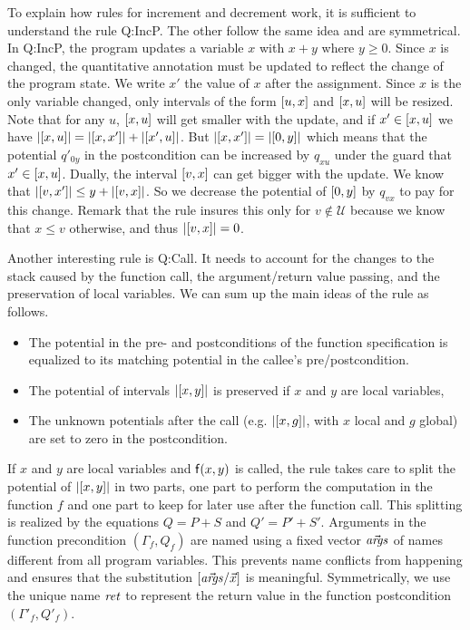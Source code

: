 \documentclass[nocopyrightspace,preprint]{sigplanconf}
\begin{document}
To explain how rules for increment and decrement work, it is
sufficient to understand the rule {\sc Q:IncP}.  The other follow the
same idea and are symmetrical.  In {\sc Q:IncP}, the program updates a
variable $x$ with $x+y$ where $y \ge 0$.  Since $x$ is changed, the
quantitative annotation must be updated to reflect the change of the
program state.  We write $x'$ the value of $x$ after the assignment.
Since $x$ is the only variable changed, only intervals of the form
$[u,x]$ and $[x,u]$ will be resized.  Note that for any $u$,
$[x,u]$ will get smaller with the update, and if $x' \in [x,u]$ we have $|[x,u]| = |[x,x']| + |[x',u]|$.  But
$|[x,x']| = |[0,y]|$ which means that the potential
$q'_{0y}$ in the postcondition can be increased by $q_{xu}$ under the
guard that $x' \in [x,u]$.  Dually, the interval $[v,x]$ can
get bigger with the update.  We know that $|[v,x']| \le y +
|[v,x]|$.  So we decrease the potential of $[0,y]$ by
$q_{vx}$ to pay for this change.  Remark that the rule insures this
only for $v \not\in \mathcal U$ because we know that $x \le v$
otherwise, and thus $|[v,x]| = 0$.

Another interesting rule is {\sc Q:Call}.  It needs to account for the
changes to the stack caused by the function call, the argument/return
value passing, and the preservation of local variables.  We can sum up
the main ideas of the rule as follows.
\begin{itemize}
\item The potential in the pre- and postconditions of the function
  specification is equalized to its matching potential in the callee's
  pre/postcondition.
\item
  The potential of intervals $|[x,y]|$ is preserved
  if $x$ and $y$ are local variables,
\item
  The unknown potentials after the call (e.g.
  $|[x,g]|$, with $x$ local and $g$ global)
  are set to zero in the postcondition.
\end{itemize}
If $x$ and $y$ are local variables and $\mathsf{f}(x,y)$ is
called, the rule takes care to split the potential of
$|[x,y]|$ in two parts, one part to perform the
computation in the function $f$ and one part to keep for
later use after the function call.  This splitting is
realized by the equations $Q = P + S$ and $Q' =
P' + S'$.  Arguments in the function precondition
$(\Gamma_f, Q_f)$ are named using a fixed vector ${\vec {\mathit{args}}}$
of names different from all program variables.  This
prevents name conflicts from happening and ensures that
the substitution $[{\vec {\mathit{args}}}/\vec x]$ is meaningful.
Symmetrically, we use the unique name ${\mathit{ret}}$ to represent
the return value in the function postcondition
$(\Gamma'_f, Q'_f)$.
\end{document}
